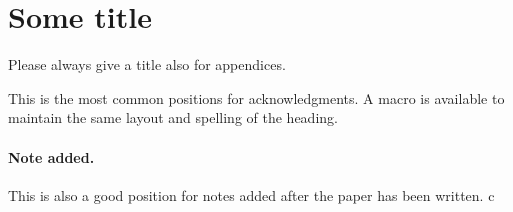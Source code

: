 \documentclass[a4paper,11pt]{article}
\begin{document}
\appendix
\section{Some title}
Please always give a title also for appendices.





\acknowledgments

This is the most common positions for acknowledgments. A macro is
available to maintain the same layout and spelling of the heading.

\paragraph{Note added.} This is also a good position for notes added
after the paper has been written. c











\end{document}
